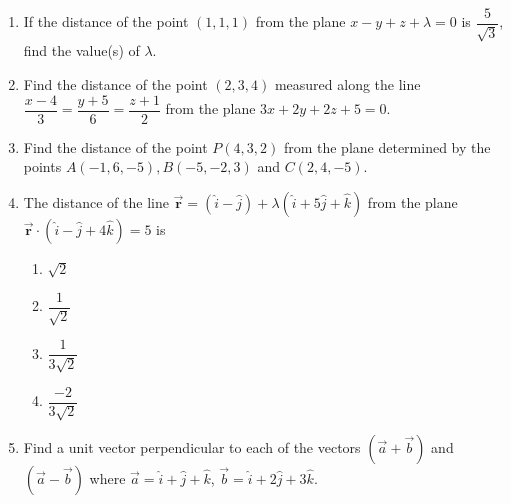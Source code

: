 %
\begin{enumerate}
\item If the distance of the point $(1,1,1)$ from the plane $x-y+z+\lambda=0$ is $\dfrac{5}{\sqrt{3}}$, find the value(s) of $\lambda$.
\item Find the distance of the point $(2,3,4)$ measured along the line $\dfrac{x-4}{3}=\dfrac{y+5}{6}=\dfrac{z+1}{2}$ from the plane $3x+2y+2z+5=0$.
\item Find the distance of the point $P(4,3,2)$ from the plane determined by the points $A(-1,6,-5),B(-5,-2,3)$ and $C(2,4,-5)$.
\item The distance of the line $\overrightarrow{\textbf{r}}=(\hat{i}-\hat{j})+\lambda(\hat{i}+5\hat{j}+\hat{k})$ from the plane $\overrightarrow{\textbf{r}}\cdot(\hat{i}-\hat{j}+4\hat{k})=5$ is
\begin{enumerate}
\item $\sqrt{2}$
\item $\dfrac{1}{\sqrt{2}}$
\item $\dfrac{1}{3\sqrt{2}}$
\item $\dfrac{-2}{3\sqrt{2}}$
\end{enumerate}
\item Find a unit vector perpendicular to each of the vectors $(\overrightarrow{a}+\overrightarrow{b})$ and $(\overrightarrow{a}-\overrightarrow{b})$ where $\overrightarrow{a}=\hat{i}+\hat{j}+\hat{k}$, $\overrightarrow{b}=\hat{i}+2\hat{j}+3\hat{k}$.
\end{enumerate}
%

